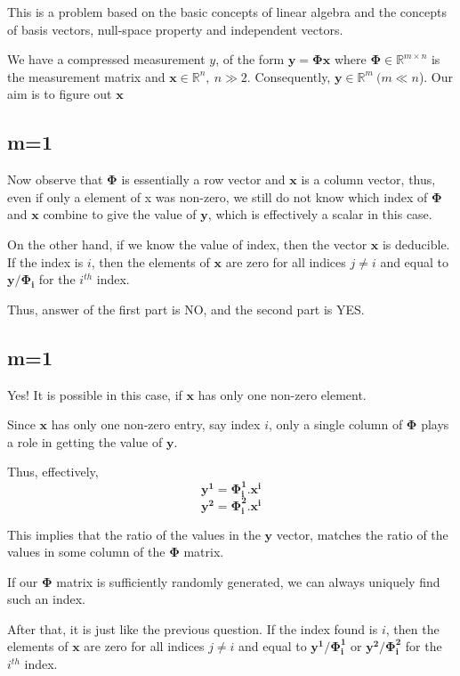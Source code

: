 \documentclass[a4paper,11pt]{article}
\numberwithin{definition}{section}
\numberwithin{mytheorem}{subsection}
\begin{document}
This is a problem based on the basic concepts of linear algebra and the concepts of basis vectors, null-space property and independent vectors.

We have a compressed measurement $y$, of the form $\mathbf{y} = \mathbf{\Phi x}$ where $\mathbf{\Phi} \in \mathbb{R}^{m \times n}$ is the measurement matrix and $\mathbf{x} \in \mathbb{R}^n, ~n \gg 2$. Consequently, $\mathbf{y} \in \mathbb{R}^m ~(m \ll n$). Our aim is to figure out $\mathbf{x}$

\subsection{m=1}
Now observe that $\mathbf{\Phi}$ is essentially a row vector and $\mathbf{x}$ is a column vector, thus, even if only a element of x was non-zero, we still do not know which index of $\mathbf{\Phi}$ and $\mathbf{x}$ combine to give the value of $\mathbf{y}$, which is effectively a scalar in this case.

On the other hand, if we know the value of index, then the vector $\mathbf{x}$ is deducible. If the index is $i$, then the elements of $\mathbf{x}$ are zero for all indices $j\neq i$ and equal to $\mathbf{y/\Phi_i}$ for the $i^{th}$ index.

Thus, answer of the first part is NO, and the second part is YES.

\subsection{m=1}

Yes! It is possible in this case, if $\mathbf{x}$ has only one non-zero element.

Since $\mathbf{x}$ has only one non-zero entry, say index $i$, only a single column of $\mathbf{\Phi}$ plays a role in getting the value of $\mathbf{y}$.

Thus, effectively,
$$\mathbf{y^1} = \mathbf{\Phi_i^1.x^i}$$
$$\mathbf{y^2} = \mathbf{\Phi_i^2.x^i}$$

This implies that the ratio of the values in the $\mathbf{y}$ vector, matches the ratio of the values in some column of the $\mathbf{\Phi}$ matrix.

If our $\mathbf{\Phi}$ matrix is sufficiently randomly generated, we can always uniquely find such an index.

After that, it is just like the previous question. If the index found is $i$, then the elements of $\mathbf{x}$ are zero for all indices $j\neq i$ and equal to $\mathbf{y^1/\Phi_i^1}$ or $\mathbf{y^2/\Phi_i^2}$ for the $i^{th}$ index.
\end{document}
